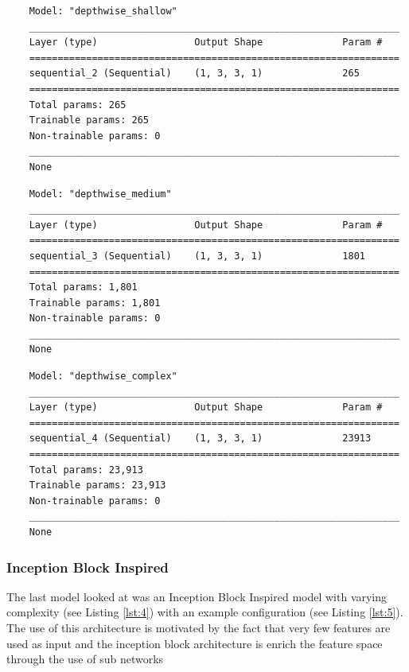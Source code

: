 \begin{verbatim}
	Model: "depthwise_shallow"
	_________________________________________________________________
	Layer (type)                 Output Shape              Param #   
	=================================================================
	sequential_2 (Sequential)    (1, 3, 3, 1)              265       
	=================================================================
	Total params: 265
	Trainable params: 265
	Non-trainable params: 0
	_________________________________________________________________
	None
\end{verbatim}

\begin{verbatim}
	Model: "depthwise_medium"
	_________________________________________________________________
	Layer (type)                 Output Shape              Param #   
	=================================================================
	sequential_3 (Sequential)    (1, 3, 3, 1)              1801      
	=================================================================
	Total params: 1,801
	Trainable params: 1,801
	Non-trainable params: 0
	_________________________________________________________________
	None
\end{verbatim}

\begin{verbatim}
	Model: "depthwise_complex"
	_________________________________________________________________
	Layer (type)                 Output Shape              Param #   
	=================================================================
	sequential_4 (Sequential)    (1, 3, 3, 1)              23913     
	=================================================================
	Total params: 23,913
	Trainable params: 23,913
	Non-trainable params: 0
	_________________________________________________________________
	None
\end{verbatim}

\subsubsection*{Inception Block Inspired}
The last model looked at was an Inception Block Inspired model with  varying complexity (see Listing \ref{lst:4}) with an example configuration (see Listing \ref{lst:5}). The use of this architecture is motivated by the fact that very few features are used as input and the inception block architecture is enrich the feature space through the use of sub networks \cite{ding2021diverse}

